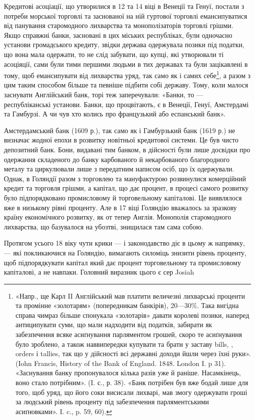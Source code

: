 Кредитові асоціації, що утворилися в 12 та 14 віці в Венеції та Генуї,
постали з потреби морської торговлі та заснованої на ній гуртової торговлі
емансипуватися від панування старомодного лихварства та монополізаторів
торговлі грішми. Якщо справжні банки, засновані в цих міських республіках,
були одночасно установи громадського кредиту, звідки держава одержувала позики
під податки, що вона мала одержати, то не слід забувати, що купці, які утворювали
ті асоціяції, сами були тими першими людьми в тих державах та були
зацікавлені в тому, щоб емансипувати від лихварства уряд, так само як і самих
себе\footnote{
«Напр., ще Карл II Англійський мав платити величезні лихварські проценти та промінне
«золотарям» (попередникам банкірів), 20—30\%. Така вигідна справа чимраз більше спонукала «золотарів»
давати королеві позики, наперед антиципувати суми, що мали надходити від податків, забирати
як забезпечення всяке асиґнування парляментом грошей, скоро те асиґнування було зроблено, а також
наввипередки купувати та брати у заставу bills, , orders і tallies, так що у дійсності всі державні
доходи
йшли через їхні руки». (Iohn Francis, History of the Bank of England. 1848. London I. p 31).
«Заснування
банку пропонувалося кілька разів уже й раніше. Насамкінець, воно стало потрібним». (I. с., р. 38).
«Банк потрібен був вже бодай лише для того, щоб уряд, що його соки висисали лихварі, мав змогу
одержувати гроші за людський рівень проценту під забезпечення парляментськими асиґновками».
I. c., p. 59, 60).
}, а разом з цим таким способом більше та певніше підбити собі державу.
Тому, коли малося заснувати Англійський банк, торі теж заперечували: «Банки,
то — республіканські установи. Банки, що процвітають, є в Венеції, Генуї,
Амстердамі та Гамбурзі. А чи чув хто колись про французький або еспанський
банк».

Амстердамський банк (1609 р.), так само як і Гамбурзький банк (1619 р.)
не визначає жодної епохи в розвитку новітньої кредитової системи. Це був
чисто депозитний банк. Бони, видавані тим банком, в дійсності були лише
досвідки про одержання складеного до банку карбованого й некарбованого благородного
металу та циркулювали лише з передатним написом осіб, що їх одержували.
Однак, в Голяндії разом з торговлею та мануфактурою розвинулися
комерційний кредит та торговля грішми, а капітал, що дає процент, в процесі
самого розвитку було підпорядковано промисловому й торговельному капіталові.
Це виявлялося вже в низькому рівні проценту. Але в 17 віці Голяндію вважалось
за зразкову країну економічного розвитку, як от тепер Англія. Монополія
старомодного лихварства, що базувалося на убозтві, знищилася там сама собою.

Протягом усього 18 віку чути крики — і законодавство діє в цьому ж напрямку,
— які покликаючися на Голяндію, вимагають силоміць знизити рівень
проценту, щоб підпорядкувати капітал який дає процент торговельному та
промисловому капіталові, а не навпаки. Головний виразник цього є сер Josiah
\parbreak{}  %
